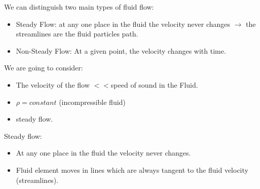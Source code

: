 \documentclass[]{beamer}
\begin{document}

\begin{frame}

We can distinguish two main types of fluid flow:
\vspace{3mm}

\begin{itemize}
\item \textcolor{mypink1}{Steady Flow:} at any one place in the fluid the velocity never 
changes \textcolor{mypink1}{$\rightarrow$ the streamlines are the fluid particles path.}
\pause
\item \textcolor{mypink1}{Non-Steady Flow:} At a given point, the velocity changes with time.
\end{itemize}

  \end{frame}

  

\begin{frame}
We are going to consider:

\pause
\vspace{5 mm}

\begin{itemize}
  \item The velocity of the flow $<<$speed of sound in the Fluid.
  \item $\rho=constant$ (incompressible fluid)
  \item steady flow.
\end{itemize}




  \end{frame}




\begin{frame}

Steady flow:

\begin{itemize}
  \item At any one place in the fluid the velocity never changes.
\pause
  \item  Fluid element moves in lines which are always tangent to the
   fluid velocity (streamlines).
\end{itemize}


  \end{frame}

\end{document}
